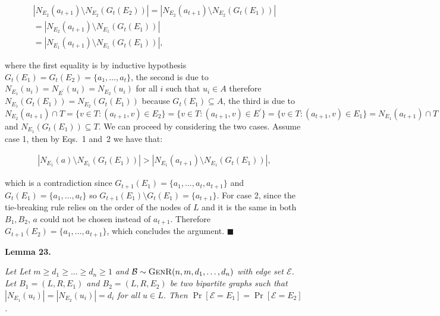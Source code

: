 \documentclass[10pt,a4paper]{article}
\begin{document}
\[\begin{gathered}
\displaystyle|N_{E_{2}}(a_{t+1})\setminus N_{E_{2}}(G_{t}(E_{2}))| \displaystyle=|N_{E_{2}}(a_{t+1})\setminus N_{E_{2}}(G_{t}(E_{1}))| \\
\displaystyle=|N_{E_{2}}(a_{t+1})\setminus N_{E_{1}}(G_{t}(E_{1}))| \\
\displaystyle=|N_{E_{1}}(a_{t+1})\setminus N_{E_{1}}(G_{t}(E_{1}))|,
\end{gathered}\]


where the first equality is by inductive hypothesis $G_{t}(E_{1})=G_{t}(E_{2})=\{a_{1},\dots,a_{t}\}$, the second is due to $N_{E_{1}}(u_{i})=N_{E^{\prime}}(u_{i})=N_{E_{2}}(u_{i})$ for all $i$ such that $u_{i}\in A$ therefore $N_{E_{1}}(G_{t}(E_{1}))=N_{E_{2}}(G_{t}(E_{1}))$ because $G_{t}(E_{1})\subseteq A$, the third is due to $N_{E_{2}}(a_{t+1})\cap T=\{v\in T:(a_{t+1},v)\in E_{2}\}=\{v\in T:(a_{t+1},v)\in E^{\prime}\}=\{v\in T:(a_{t+1},v)\in E_{1}\}=N_{E_{1}}(a_{t+1})\cap T$ and $N_{E_{1}}(G_{t}(E_{1}))\subseteq T$.
We can proceed by considering the two cases.
Assume case 1, then by Eqs. 1 and 2 we have that:\par


\[\begin{gathered}
\displaystyle|N_{E_{1}}(a)\setminus N_{E_{1}}(G_{t}(E_{1}))|>|N_{E_{1}}(a_{t+1})\setminus N_{E_{1}}(G_{t}(E_{1}))|,
\end{gathered}\]


which is a contradiction since $G_{t+1}(E_{1})=\{a_{1},\dots,a_{t},a_{t+1}\}$ and $G_{t}(E_{1})=\{a_{1},\dots,a_{t}\}$ so $G_{t+1}(E_{1})\setminus G_{t}(E_{1})=\{a_{t+1}\}$.
For case 2, since the tie-breaking rule relies on the order of the nodes of $L$ and it is the same in both $B_{1},B_{2}$, $a$ could not be chosen instead of $a_{t+1}$.
Therefore $G_{t+1}(E_{2})=\{a_{1},\dots,a_{t+1}\}$, which concludes the argument.
\ensuremath{\blacksquare}\par






\par\medskip\noindent\textbf{\textbf{Lemma 23}\textbf{.}}\par



\emph{Let Let $m\geq d_{1}\geq\dots\geq d_{n}\geq 1$ and $\mathcal{B}\sim\textsc{GenR}(n,m,d_{1},\dots,d_{n})$ with edge set $\mathcal{E}$.
Let $B_{1}=(L,R,E_{1})$ and $B_{2}=(L,R,E_{2})$ be two bipartite graphs such that
$|N_{E_{1}}(u_{i})|=|N_{E_{2}}(u_{i})|=d_{i}$ for all $u\in L$.
Then $\Pr[\mathcal{E}=E_{1}]=\Pr[\mathcal{E}=E_{2}]$.}\par
\end{document}
